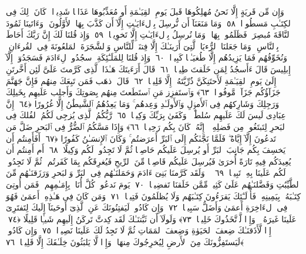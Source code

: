  وَإِن مِّن قَريَةٍ إِلَّا نَحنُ مُهلِكُوهَا قَبلَ يَومِ ٱلقِيَـٰمَةِ أَو مُعَذِّبُوهَا عَذَابًۭا شَدِيدًۭا ۚ كَانَ ذَٟلِكَ فِى ٱلكِتَـٰبِ مَسطُورًۭا ﴿٥٨﴾
 وَمَا مَنَعَنَآ أَن نُّرسِلَ بِٱلءَايَـٰتِ إِلَّآ أَن كَذَّبَ بِهَا ٱلأَوَّلُونَ ۚ وَءَاتَينَا ثَمُودَ ٱلنَّاقَةَ مُبصِرَةًۭ فَظَلَمُوا۟ بِهَا ۚ وَمَا نُرسِلُ بِٱلءَايَـٰتِ إِلَّا تَخوِيفًۭا ﴿٥٩﴾
 وَإِذ قُلنَا لَكَ إِنَّ رَبَّكَ أَحَاطَ بِٱلنَّاسِ ۚ وَمَا جَعَلنَا ٱلرُّءيَا ٱلَّتِىٓ أَرَينَـٰكَ إِلَّا فِتنَةًۭ لِّلنَّاسِ وَٱلشَّجَرَةَ ٱلمَلعُونَةَ فِى ٱلقُرءَانِ ۚ وَنُخَوِّفُهُم فَمَا يَزِيدُهُم إِلَّا طُغيَـٰنًۭا كَبِيرًۭا ﴿٦٠﴾
 وَإِذ قُلنَا لِلمَلَـٰٓئِكَةِ ٱسجُدُوا۟ لِءَادَمَ فَسَجَدُوٓا۟ إِلَّآ إِبلِيسَ قَالَ ءَأَسجُدُ لِمَن خَلَقتَ طِينًۭا ﴿٦١﴾
 قَالَ أَرَءَيتَكَ هَـٰذَا ٱلَّذِى كَرَّمتَ عَلَىَّ لَئِن أَخَّرتَنِ إِلَىٰ يَومِ ٱلقِيَـٰمَةِ لَأَحتَنِكَنَّ ذُرِّيَّتَهُۥٓ إِلَّا قَلِيلًۭا ﴿٦٢﴾
 قَالَ ٱذهَب فَمَن تَبِعَكَ مِنهُم فَإِنَّ جَهَنَّمَ جَزَآؤُكُم جَزَآءًۭ مَّوفُورًۭا ﴿٦٣﴾
 وَٱستَفزِز مَنِ ٱستَطَعتَ مِنهُم بِصَوتِكَ وَأَجلِب عَلَيهِم بِخَيلِكَ وَرَجِلِكَ وَشَارِكهُم فِى ٱلأَموَٟلِ وَٱلأَولَـٰدِ وَعِدهُم ۚ وَمَا يَعِدُهُمُ ٱلشَّيطَٰنُ إِلَّا غُرُورًا ﴿٦٤﴾
 إِنَّ عِبَادِى لَيسَ لَكَ عَلَيهِم سُلطَٰنٌۭ ۚ وَكَفَىٰ بِرَبِّكَ وَكِيلًۭا ﴿٦٥﴾
 رَّبُّكُمُ ٱلَّذِى يُزجِى لَكُمُ ٱلفُلكَ فِى ٱلبَحرِ لِتَبتَغُوا۟ مِن فَضلِهِۦٓ ۚ إِنَّهُۥ كَانَ بِكُم رَحِيمًۭا ﴿٦٦﴾
 وَإِذَا مَسَّكُمُ ٱلضُّرُّ فِى ٱلبَحرِ ضَلَّ مَن تَدعُونَ إِلَّآ إِيَّاهُ ۖ فَلَمَّا نَجَّىٰكُم إِلَى ٱلبَرِّ أَعرَضتُم ۚ وَكَانَ ٱلإِنسَـٰنُ كَفُورًا ﴿٦٧﴾
 أَفَأَمِنتُم أَن يَخسِفَ بِكُم جَانِبَ ٱلبَرِّ أَو يُرسِلَ عَلَيكُم حَاصِبًۭا ثُمَّ لَا تَجِدُوا۟ لَكُم وَكِيلًا ﴿٦٨﴾
 أَم أَمِنتُم أَن يُعِيدَكُم فِيهِ تَارَةً أُخرَىٰ فَيُرسِلَ عَلَيكُم قَاصِفًۭا مِّنَ ٱلرِّيحِ فَيُغرِقَكُم بِمَا كَفَرتُم ۙ ثُمَّ لَا تَجِدُوا۟ لَكُم عَلَينَا بِهِۦ تَبِيعًۭا ﴿٦٩﴾
 ۞ وَلَقَد كَرَّمنَا بَنِىٓ ءَادَمَ وَحَمَلنَـٰهُم فِى ٱلبَرِّ وَٱلبَحرِ وَرَزَقنَـٰهُم مِّنَ ٱلطَّيِّبَٰتِ وَفَضَّلنَـٰهُم عَلَىٰ كَثِيرٍۢ مِّمَّن خَلَقنَا تَفضِيلًۭا ﴿٧٠﴾
 يَومَ نَدعُوا۟ كُلَّ أُنَاسٍۭ بِإِمَـٰمِهِم ۖ فَمَن أُوتِىَ كِتَـٰبَهُۥ بِيَمِينِهِۦ فَأُو۟لَـٰٓئِكَ يَقرَءُونَ كِتَـٰبَهُم وَلَا يُظلَمُونَ فَتِيلًۭا ﴿٧١﴾
 وَمَن كَانَ فِى هَـٰذِهِۦٓ أَعمَىٰ فَهُوَ فِى ٱلءَاخِرَةِ أَعمَىٰ وَأَضَلُّ سَبِيلًۭا ﴿٧٢﴾
 وَإِن كَادُوا۟ لَيَفتِنُونَكَ عَنِ ٱلَّذِىٓ أَوحَينَآ إِلَيكَ لِتَفتَرِىَ عَلَينَا غَيرَهُۥ ۖ وَإِذًۭا لَّٱتَّخَذُوكَ خَلِيلًۭا ﴿٧٣﴾
 وَلَولَآ أَن ثَبَّتنَـٰكَ لَقَد كِدتَّ تَركَنُ إِلَيهِم شَيـًۭٔا قَلِيلًا ﴿٧٤﴾
 إِذًۭا لَّأَذَقنَـٰكَ ضِعفَ ٱلحَيَوٰةِ وَضِعفَ ٱلمَمَاتِ ثُمَّ لَا تَجِدُ لَكَ عَلَينَا نَصِيرًۭا ﴿٧٥﴾
 وَإِن كَادُوا۟ لَيَستَفِزُّونَكَ مِنَ ٱلأَرضِ لِيُخرِجُوكَ مِنهَا ۖ وَإِذًۭا لَّا يَلبَثُونَ خِلَـٰفَكَ إِلَّا قَلِيلًۭا ﴿٧٦﴾
